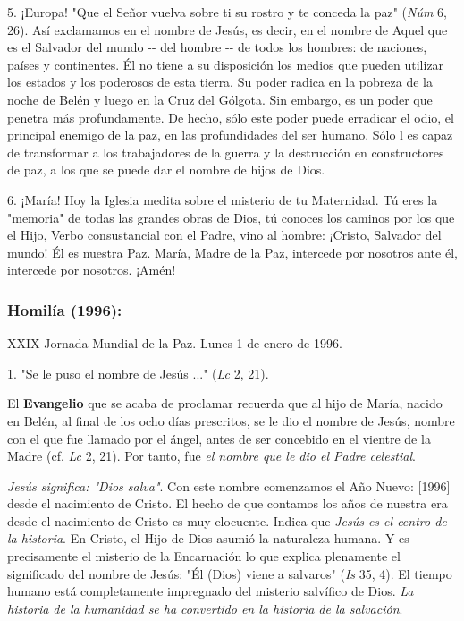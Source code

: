 \begin{body}
5. ¡Europa! "Que el Señor vuelva sobre ti su rostro y te conceda la paz" (\emph{Núm} 6, 26). Así exclamamos en el nombre de Jesús, es decir, en el nombre de Aquel que es el Salvador del mundo -\/- del hombre -\/- de todos los hombres: de naciones, países y continentes. Él no tiene a su disposición los medios que pueden utilizar los estados y los poderosos de esta tierra. Su poder radica en la pobreza de la noche de Belén y luego en la Cruz del Gólgota. Sin embargo, es un poder que penetra más profundamente. De hecho, sólo este poder puede erradicar el odio, el principal enemigo de la paz, en las profundidades del ser humano. Sólo l es capaz de transformar a los trabajadores de la guerra y la destrucción en constructores de paz, a los que se puede dar el nombre de hijos de Dios.

6. ¡María! Hoy la Iglesia medita sobre el misterio de tu Maternidad. Tú eres la "memoria" de todas las grandes obras de Dios, tú conoces los caminos por los que el Hijo, Verbo consustancial con el Padre, vino al hombre: ¡Cristo, Salvador del mundo! Él es nuestra Paz. María, Madre de la Paz, intercede por nosotros ante él, intercede por nosotros. ¡Amén!

\subsubsection{Homilía (1996): }

XXIX Jornada Mundial de la Paz. Lunes 1 de enero de 1996.

1. "Se le puso el nombre de Jesús ..." (\emph{Lc} 2, 21).

El \textbf{Evangelio} que se acaba de proclamar recuerda que al hijo de María, nacido en Belén, al final de los ocho días prescritos, se le dio el nombre de Jesús, nombre con el que fue llamado por el ángel, antes de ser concebido en el vientre de la Madre (cf. \emph{Lc} 2, 21). Por tanto, fue \emph{el nombre que le dio el Padre celestial}.

\emph{Jesús significa: "Dios salva"}. Con este nombre comenzamos el Año Nuevo: {[}1996{]} desde el nacimiento de Cristo. El hecho de que contamos los años de nuestra era desde el nacimiento de Cristo es muy elocuente. Indica que \emph{Jesús es el centro de la historia}. En Cristo, el Hijo de Dios asumió la naturaleza humana. Y es precisamente el misterio de la Encarnación lo que explica plenamente el significado del nombre de Jesús: "Él (Dios) viene a salvaros" (\emph{Is} 35, 4). El tiempo humano está completamente impregnado del misterio salvífico de Dios. \emph{La historia de la humanidad se ha convertido en la historia de la salvación}.


\end{body}
